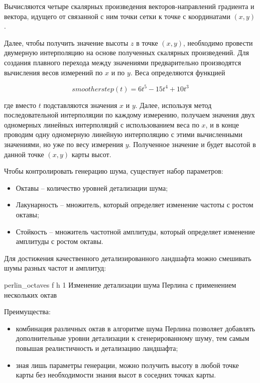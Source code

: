 Вычисляются четыре скалярных произведения векторов-направлений
градиента и вектора, идущего от связанной с ним точки сетки к точке с
координатами $(x, y)$.

Далее, чтобы получить значение высоты $z$ в точке $(x, y)$, необходимо провести двумерную интерполяцию на основе полученных скалярных произведений. Для создания плавного перехода между значениями предварительно производятся вычисления весов измерений по $x$ и по $y$. Веса определяются функцией

\begin{equation}
	\label{equ:perlin}
	smootherstep(t) = 6t^5 - 15t^4 + 10t^3
\end{equation}
	
где вместо $t$ подставляются значения $x$ и $y$. Далее, используя метод последовательной интерполяции по каждому измерению, получаем значения двух одномерных линейных интерполяций с использованием веса по $x$, и в конце проводим одну одномерную линейную интерполяцию с этими вычисленными значениями, но уже по весу измерения $y$. Полученное значение и будет высотой в данной точке
$(x, y)$ карты высот. 

Чтобы контролировать генерацию шума, существует набор параметров:

\begin{itemize}[label=--]
	\item Октавы -- количество уровней детализации шума;
	\item Лакунарность -- множитель, который определяет изменение частоты с ростом октавы;
	\item Стойкость -- множитель частотной амплитуды, который
	определяет изменение амплитуды с ростом октавы.
\end{itemize}

\clearpage

Для достижения качественного детализированного ландшафта можно смешивать шумы разных частот и амплитуд:

{perlin_octaves} %
{f} %
{h} %
{1\textwidth} %
{Изменение детализации шума Перлина с применением нескольких октав} %

Преимущества:

\begin{itemize}[label=--]
	\item комбинация различных октав в алгоритме шума Перлина позволяет
	добавлять дополнительные уровни детализации к сгенерированному
	шуму, тем самым повышая реалистичность и детализацию 
	ландшафта;
	\item зная лишь параметры генерации, можно получить высоту в любой
	точке карты без необходимости знания высот в соседних точках
	карты.
\end{itemize}

